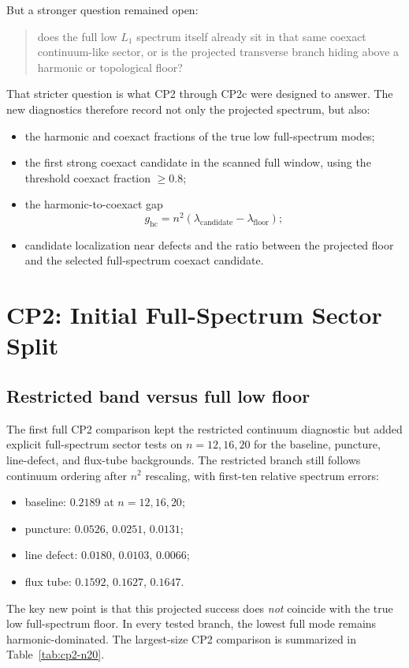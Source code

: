 \documentclass[11pt]{article}
\begin{document}
But a stronger question remained open:
\begin{quote}
does the full low $L_1$ spectrum itself already sit in that same coexact continuum-like sector, or is the projected transverse branch hiding above a harmonic or topological floor?
\end{quote}

That stricter question is what CP2 through CP2c were designed to answer. The new diagnostics therefore record not only the projected spectrum, but also:
\begin{itemize}
\item the harmonic and coexact fractions of the true low full-spectrum modes;
\item the first strong coexact candidate in the scanned full window, using the threshold coexact fraction $\geq 0.8$;
\item the harmonic-to-coexact gap
\[
g_{\mathrm{hc}} = n^2(\lambda_{\mathrm{candidate}}-\lambda_{\mathrm{floor}});
\]
\item candidate localization near defects and the ratio between the projected floor and the selected full-spectrum coexact candidate.
\end{itemize}

\section{CP2: Initial Full-Spectrum Sector Split}

\subsection{Restricted band versus full low floor}

The first full CP2 comparison kept the restricted continuum diagnostic but added explicit full-spectrum sector tests on $n=12,16,20$ for the baseline, puncture, line-defect, and flux-tube backgrounds. The restricted branch still follows continuum ordering after $n^2$ rescaling, with first-ten relative spectrum errors:
\begin{itemize}
\item baseline: $0.2189$ at $n=12,16,20$;
\item puncture: $0.0526$, $0.0251$, $0.0131$;
\item line defect: $0.0180$, $0.0103$, $0.0066$;
\item flux tube: $0.1592$, $0.1627$, $0.1647$.
\end{itemize}

The key new point is that this projected success does \emph{not} coincide with the true low full-spectrum floor. In every tested branch, the lowest full mode remains harmonic-dominated. The largest-size CP2 comparison is summarized in Table~\ref{tab:cp2-n20}.
\end{document}
